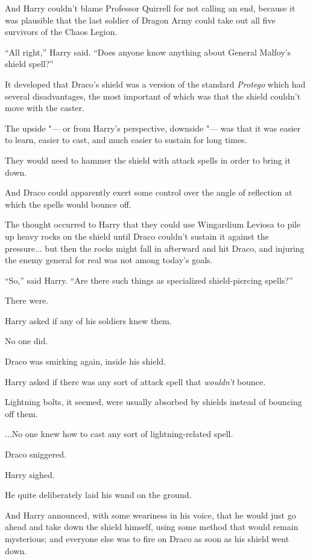 And Harry couldn't blame Professor Quirrell for not calling an end,
because it was plausible that the last soldier of Dragon Army could take
out all five survivors of the Chaos Legion.

``All right,'' Harry said. ``Does anyone know anything about General
Malfoy's shield spell?''

It developed that Draco's shield was a version of the standard
\emph{Protego} which had several disadvantages, the most important of
which was that the shield couldn't move with the caster.

The upside "--- or from Harry's perspective, downside "--- was that it was
easier to learn, easier to cast, and much easier to sustain for long
times.

They would need to hammer the shield with attack spells in order to
bring it down.

And Draco could apparently exert some control over the angle of
reflection at which the spells would bounce off.

The thought occurred to Harry that they could use Wingardium Leviosa to
pile up heavy rocks on the shield until Draco couldn't sustain it
against the pressure... but then the rocks might fall in afterward
and hit Draco, and injuring the enemy general for real was not among
today's goals.

``So,'' said Harry. ``Are there such things as specialized
shield-piercing spells?''

There were.

Harry asked if any of his soldiers knew them.

No one did.

Draco was smirking again, inside his shield.

Harry asked if there was any sort of attack spell that \emph{wouldn't}
bounce.

Lightning bolts, it seemed, were usually absorbed by shields instead of
bouncing off them.

...No one knew how to cast any sort of lightning-related spell.

Draco sniggered.

Harry sighed.

He quite deliberately laid his wand on the ground.

And Harry announced, with some weariness in his voice, that he would
just go ahead and take down the shield himself, using some method that
would remain mysterious; and everyone else was to fire on Draco as soon
as his shield went down.

